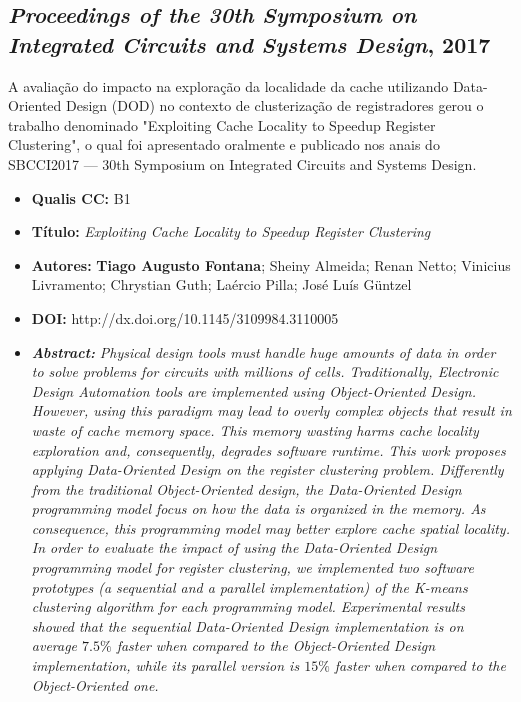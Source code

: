 \subsection{\textit{Proceedings of the 30th Symposium on Integrated Circuits and Systems Design}, 2017}

A avaliação do impacto na exploração da localidade da cache utilizando Data-Oriented Design (DOD) no contexto de clusterização de registradores gerou o trabalho denominado "Exploiting Cache Locality to Speedup Register Clustering", o qual foi apresentado oralmente e publicado nos anais do SBCCI2017 --- 30th Symposium on Integrated Circuits and Systems Design.

\begin{itemize}
\item \textbf{Qualis CC:} B1
\item \textbf{Título:} \textit{Exploiting Cache Locality to Speedup Register Clustering}
\item \textbf{Autores:}  \textbf{Tiago Augusto Fontana}; Sheiny Almeida; Renan Netto; Vinicius Livramento; Chrystian Guth;  Laércio Pilla; José Luís Güntzel
\item \textbf{DOI:} http://dx.doi.org/10.1145/3109984.3110005
\item \textbf{\textit{Abstract:}} \emph{Physical design tools must handle huge amounts of data in order to solve problems for circuits with millions of cells. Traditionally, Electronic Design Automation tools are implemented using Object-Oriented Design. However, using this paradigm may lead to overly complex objects that result in waste of cache memory space. This memory wasting harms cache locality exploration and, consequently, degrades software runtime. This work proposes applying Data-Oriented Design on the register clustering problem. Differently from the traditional Object-Oriented design, the Data-Oriented Design programming model focus on how the data is organized in the memory. As consequence, this programming model may better explore cache spatial locality. In order to evaluate the impact of using the Data-Oriented Design programming model for register clustering, we implemented two software prototypes (a sequential and a parallel implementation) of the K-means clustering algorithm for each programming model. Experimental results showed that the sequential Data-Oriented Design implementation is on average $7.5\%$ faster when compared to the Object-Oriented Design implementation, while its parallel version is $15\%$ faster when compared to the Object-Oriented one.}
\end{itemize}

